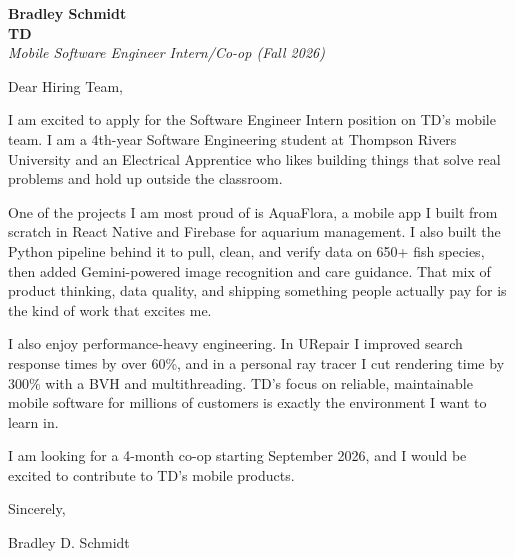 \documentclass[11pt]{article}
\begin{document}
\textbf{Bradley Schmidt}\\
\vspace{0.5em}
\textbf{TD}\\
\textit{Mobile Software Engineer Intern/Co-op (Fall 2026)}

Dear Hiring Team,

\par

I am excited to apply for the Software Engineer Intern position on TD's mobile team. I am a 4th-year Software Engineering student at Thompson Rivers University and an Electrical Apprentice who likes building things that solve real problems and hold up outside the classroom.

\par

One of the projects I am most proud of is AquaFlora, a mobile app I built from scratch in React Native and Firebase for aquarium management. I also built the Python pipeline behind it to pull, clean, and verify data on 650+ fish species, then added Gemini-powered image recognition and care guidance. That mix of product thinking, data quality, and shipping something people actually pay for is the kind of work that excites me.

\par

I also enjoy performance-heavy engineering. In URepair I improved search response times by over 60\%, and in a personal ray tracer I cut rendering time by 300\% with a BVH and multithreading. TD's focus on reliable, maintainable mobile software for millions of customers is exactly the environment I want to learn in.

\par

I am looking for a 4-month co-op starting September 2026, and I would be excited to contribute to TD's mobile products.

\par

Sincerely,

\par

Bradley D. Schmidt
\end{document}
